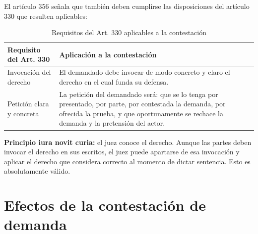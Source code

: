 \documentclass[12pt,oneside]{book}
\begin{document}
El artículo 356 señala que también deben cumplirse las disposiciones del artículo 330 que resulten aplicables:

\begin{table}[H]
\centering
\caption{Requisitos del Art. 330 aplicables a la contestación}
\begin{tabularx}{\textwidth}{p{} X}
\toprule
\textbf{Requisito del Art. 330} & \textbf{Aplicación a la contestación} \\
\midrule
Invocación del derecho & El demandado debe invocar de modo concreto y claro el derecho en el cual funda su defensa. \\
Petición clara y concreta & La petición del demandado será: que se lo tenga por presentado, por parte, por contestada la demanda, por ofrecida la prueba, y que oportunamente se rechace la demanda y la pretensión del actor. \\
\bottomrule
\end{tabularx}
\end{table}

\begin{important}
\textbf{Principio iura novit curia:} el juez conoce el derecho. Aunque las partes deben invocar el derecho en sus escritos, el juez puede apartarse de esa invocación y aplicar el derecho que considera correcto al momento de dictar sentencia. Esto es absolutamente válido.
\end{important}

\section{Efectos de la contestación de demanda}
\end{document}
